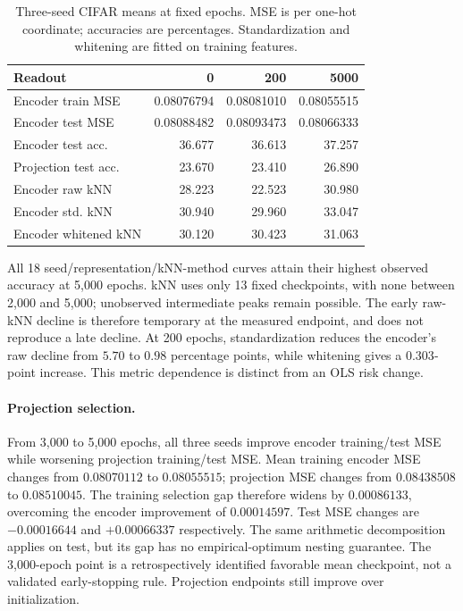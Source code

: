 \begin{table}[t]
\centering\small
\caption{Three-seed CIFAR means at fixed epochs. MSE is per one-hot coordinate; accuracies are percentages. Standardization and whitening are fitted on training features.}
\label{supp:natural-class-long}
\setlength{\tabcolsep}{3pt}
\begin{tabular}{lrrr}
\toprule
Readout&0&200&5000\\\midrule
Encoder train MSE&0.08076794&0.08081010&0.08055515\\
Encoder test MSE&0.08088482&0.08093473&0.08066333\\
Encoder test acc.&36.677&36.613&37.257\\
Projection test acc.&23.670&23.410&26.890\\
Encoder raw kNN&28.223&22.523&30.980\\
Encoder std. kNN&30.940&29.960&33.047\\
Encoder whitened kNN&30.120&30.423&31.063\\\bottomrule
\end{tabular}
\end{table}

All 18 seed/representation/kNN-method curves attain their highest observed accuracy at 5,000 epochs. kNN uses only 13 fixed checkpoints, with none between 2,000 and 5,000; unobserved intermediate peaks remain possible. The early raw-kNN decline is therefore temporary at the measured endpoint, and does not reproduce a late decline. At 200 epochs, standardization reduces the encoder's raw decline from $5.70$ to $0.98$ percentage points, while whitening gives a $0.303$-point increase. This metric dependence is distinct from an OLS risk change.

\paragraph{Projection selection.}
From 3,000 to 5,000 epochs, all three seeds improve encoder training/test MSE while worsening projection training/test MSE. Mean training encoder MSE changes from $0.08070112$ to $0.08055515$; projection MSE changes from $0.08438508$ to $0.08510045$. The training selection gap therefore widens by $0.00086133$, overcoming the encoder improvement of $0.00014597$. Test MSE changes are $-0.00016644$ and $+0.00066337$ respectively. The same arithmetic decomposition applies on test, but its gap has no empirical-optimum nesting guarantee. The 3,000-epoch point is a retrospectively identified favorable mean checkpoint, not a validated early-stopping rule. Projection endpoints still improve over initialization.

